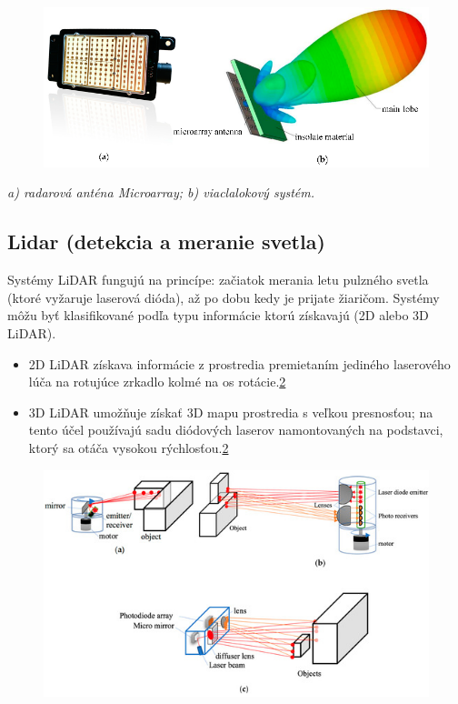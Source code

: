 \documentclass[10pt,oneside,slovak,a4paper]{article}
\begin{document}
\begin{figure}[!h]

\centering
\includegraphics[scale=1]{radar.png}
\label{fig:radar}
\end{figure}

\begin{center}
\centering
{
\emph{ a) radarová anténa Microarray; b) viaclalokový systém\cite{s19030648}.}
}
\end{center}



\subsection{Lidar (detekcia a meranie svetla)}
Systémy LiDAR fungujú na princípe: začiatok merania letu pulzného svetla (ktoré vyžaruje laserová dióda), až po dobu kedy je prijate žiaričom. Systémy môžu byť klasifikované podľa typu informácie ktorú získavajú (2D alebo 3D LiDAR).\cite{s19030648}

\begin{itemize}
\item 2D LiDAR získava informácie z prostredia premietaním jediného laserového lúča na rotujúce zrkadlo kolmé na os rotácie.\ref{fig:lidar}

\item 3D LiDAR umožňuje získať 3D mapu prostredia s veľkou presnosťou; na tento účel používajú sadu diódových laserov namontovaných na podstavci, ktorý sa otáča vysokou rýchlosťou.\ref{fig:lidar}
\end{itemize}

\newpage

\begin{figure}[!h]
\centering
\includegraphics[scale=0.8]{lidar.jpg}

\label{fig:lidar}
\end{figure}
\end{document}
